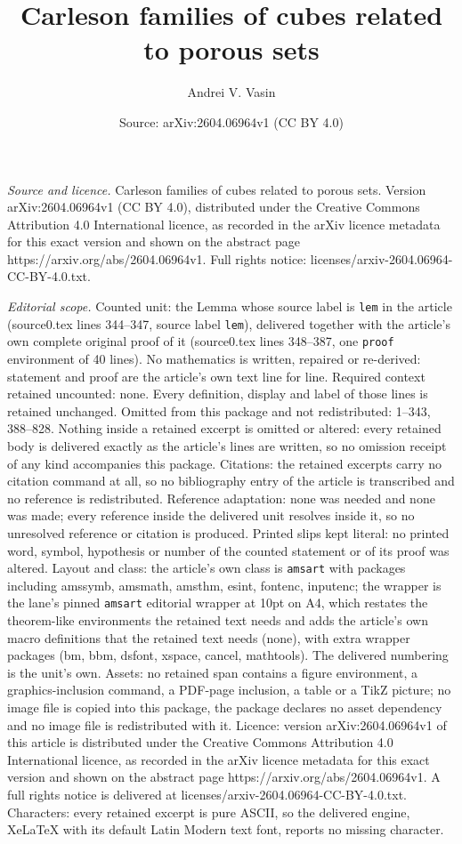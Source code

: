 \documentclass[10pt,a4paper]{amsart}
\title[Carleson families of cubes related to porous sets]{Carleson families of cubes related to porous sets}
\author{Andrei V. Vasin}
\date{Source: arXiv:2604.06964v1 (CC BY 4.0)}
\begin{document}
\maketitle

\noindent\emph{Source and licence.} Carleson families of cubes related to porous sets. Version arXiv:2604.06964v1 (CC BY 4.0), distributed under the Creative Commons Attribution 4.0 International licence, as recorded in the arXiv licence metadata for this exact version and shown on the abstract page https://arxiv.org/abs/2604.06964v1. Full rights notice: licenses/arxiv-2604.06964-CC-BY-4.0.txt.\par\smallskip

\noindent\textit{Editorial scope.} Counted unit: the Lemma whose source label is \texttt{lem} in the article (source0.tex lines 344--347, source label \texttt{lem}), delivered together with the article's own complete original proof of it (source0.tex lines 348--387, one \texttt{proof} environment of 40 lines). No mathematics is written, repaired or re-derived: statement and proof are the article's own text line for line. Required context retained uncounted: none. Every definition, display and label of those lines is retained unchanged. Omitted from this package and not redistributed: 1--343, 388--828. Nothing inside a retained excerpt is omitted or altered: every retained body is delivered exactly as the article's lines are written, so no omission receipt of any kind accompanies this package. Citations: the retained excerpts carry no citation command at all, so no bibliography entry of the article is transcribed and no reference is redistributed. Reference adaptation: none was needed and none was made; every reference inside the delivered unit resolves inside it, so no unresolved reference or citation is produced. Printed slips kept literal: no printed word, symbol, hypothesis or number of the counted statement or of its proof was altered. Layout and class: the article's own class is \texttt{amsart} with packages including amssymb, amsmath, amsthm, esint, fontenc, inputenc; the wrapper is the lane's pinned \texttt{amsart} editorial wrapper at 10pt on A4, which restates the theorem-like environments the retained text needs and adds the article's own macro definitions that the retained text needs (none), with extra wrapper packages (bm, bbm, dsfont, xspace, cancel, mathtools). The delivered numbering is the unit's own. Assets: no retained span contains a figure environment, a graphics-inclusion command, a PDF-page inclusion, a table or a TikZ picture; no image file is copied into this package, the package declares no asset dependency and no image file is redistributed with it. Licence: version arXiv:2604.06964v1 of this article is distributed under the Creative Commons Attribution 4.0 International licence, as recorded in the arXiv licence metadata for this exact version and shown on the abstract page https://arxiv.org/abs/2604.06964v1. A full rights notice is delivered at licenses/arxiv-2604.06964-CC-BY-4.0.txt. Characters: every retained excerpt is pure ASCII, so the delivered engine, XeLaTeX with its default Latin Modern text font, reports no missing character.
\end{document}
